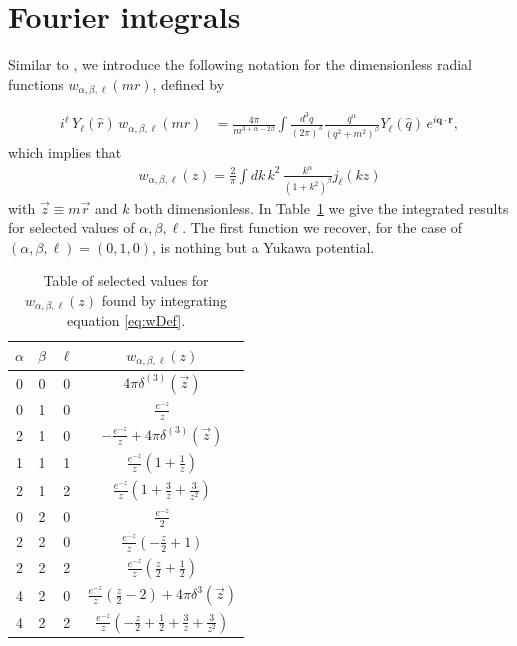 \documentclass[%
 preprint,
 amsmath,amssymb,
 aps,
]{revtex4-1}
\newcommand{\w}[4]{w_{#1,#2,#3}(#4)}
\begin{document}
\section{\label{app:wNotation}Fourier integrals}

Similar to \cite{PhysRevC.85.024003}, we introduce the following notation for the dimensionless radial functions $\w{\alpha}{\beta}{\ell}{ m r }$, defined by

\begin{align}
i^\ell \, Y_\ell(\hat{r}) \, \w{\alpha}{\beta}{\ell}{ m r}  &= \frac{4 \pi}{m^{3+\alpha-2\beta} }  \int \frac{d^3 q}{(2\pi)^3} \frac{q^\alpha}{(q^2+m^2)^\beta} Y_\ell(\hat{q}) \, e^{i \mathbf{q} \cdot \mathbf{r}  },
\end{align}
which implies that
\begin{align}\label{eq:wDef}
\w{\alpha}{\beta}{\ell}{z} =  \frac{2}{\pi} \int dk \, k^2 \, \frac{k^\alpha}{(1+k^2)^\beta} j_\ell(k z)
\end{align}
with $\vec{z} \equiv m \vec{r}$ and $k$ both dimensionless. In Table~\ref{table:wTable} we give the integrated results for selected values of $\alpha, \beta, \ell$. The first function we recover, for the case of $(\alpha, \beta, \ell ) = (0,1,0)$, is nothing but a Yukawa potential.

\begin{table}
\begin{center}
\begin{tabular}{| c c c | c |}
\hline
$\alpha$ & $\beta$ & $\ell$ & $ \w{\alpha}{\beta}{\ell}{z}$ \\
\hline
0 & 0 & 0 & $ 4\pi \delta^{(3)}(\vec{z}) $ \\
0 & 1 & 0 & $ \frac{\displaystyle e^{-z}}{\displaystyle z} $ \\
2 & 1 & 0 & $ -\frac{\displaystyle e^{-z}}{\displaystyle z} + 4\pi \delta^{(3)}(\vec{z}) $ \\
1 & 1 & 1 &  $\frac{\displaystyle e^{-z}}{\displaystyle z} (1 + \tfrac{1}{z})  $ \\
2 & 1 & 2 & $ \frac{\displaystyle e^{-z}}{\displaystyle z} (1+ \tfrac{3}{z} + \tfrac{3}{z^2} )$ \\
0 & 2 & 0 & $ \frac{\displaystyle e^{-z}}{2} $ \\
2 & 2 & 0 & $ \frac{\displaystyle e^{-z}}{\displaystyle z} (-\tfrac{z}{2} + 1 ) $ \\
2 & 2 & 2 & $  \frac{\displaystyle e^{-z}}{\displaystyle z} (\tfrac{z}{2} + \tfrac{1}{2} ) $ \\
4 & 2 & 0 & $  \frac{\displaystyle e^{-z}}{\displaystyle z} (\tfrac{z}{2} - 2 ) + 4 \pi \delta^3( \vec{z} )  $ \\
4 & 2 & 2 & $  \frac{\displaystyle e^{-z}}{\displaystyle z} ( - \tfrac{z}{2} + \tfrac{1}{2} + \tfrac{3}{z} + \tfrac{3}{z^2} ) $ \\
\hline
\end{tabular}
\end{center}
\caption{\label{table:wTable} Table of selected values for $\w{\alpha}{\beta}{\ell}{z}$ found by integrating equation \eqref{eq:wDef}.}
\end{table}
\end{document}
